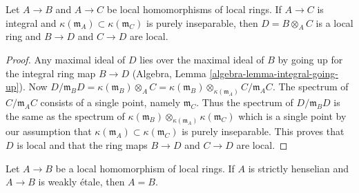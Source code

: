 \begin{lemma}
\label{lemma-local-tensor-with-integral}
Let $A \to B$ and $A \to C$ be local homomorphisms of local rings.
If $A \to C$ is integral and
$\kappa(\mathfrak m_A) \subset \kappa(\mathfrak m_C)$ is purely
inseparable, then $D = B \otimes_A C$ is a local ring and
$B \to D$ and $C \to D$ are local.
\end{lemma}

\begin{proof}
Any maximal ideal of $D$ lies over the maximal ideal of $B$ by
going up for the integral ring map
$B \to D$ (Algebra, Lemma \ref{algebra-lemma-integral-going-up}).
Now $D/\mathfrak m_B D = \kappa(\mathfrak m_B) \otimes_A C =
\kappa(\mathfrak m_B) \otimes_{\kappa(\mathfrak m_A)} C/\mathfrak m_A C$.
The spectrum of $C/\mathfrak m_A C$ consists of a
single point, namely $\mathfrak m_C$. Thus the spectrum of
$D/\mathfrak m_B D$ is the same as the spectrum of
$\kappa(\mathfrak m_B) \otimes_{\kappa(\mathfrak m_A)} \kappa(\mathfrak m_C)$
which is a single point by our assumption that
$\kappa(\mathfrak m_A) \subset \kappa(\mathfrak m_C)$ is purely
inseparable. This proves that $D$ is local and that the ring maps
$B \to D$ and $C \to D$ are local.
\end{proof}

\begin{theorem}[Olivier]
\label{theorem-olivier}
Let $A \to B$ be a local homomorphism of local rings.
If $A$ is strictly henselian and $A \to B$ is weakly \'etale, then
$A = B$.
\end{theorem}

